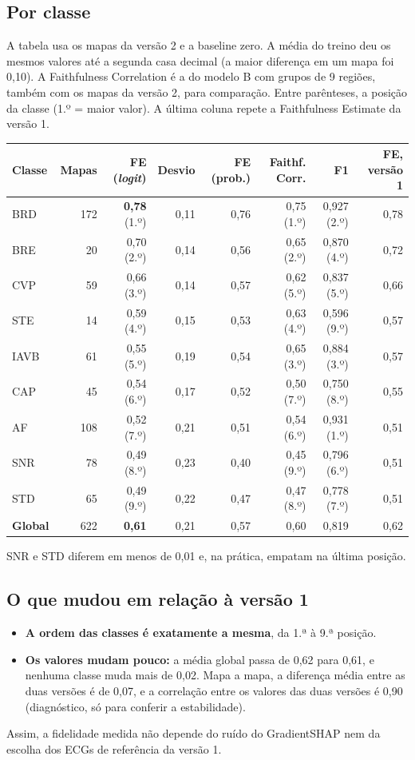\documentclass[11pt,a4paper]{article}
\begin{document}
\subsection{Por classe}
A tabela usa os mapas da versão 2 e a baseline zero. A média do treino deu os mesmos valores até a segunda casa decimal (a maior diferença em um mapa foi 0,10). A Faithfulness Correlation é a do modelo B com grupos de 9 regiões, também com os mapas da versão 2, para comparação. Entre parênteses, a posição da classe (1.º = maior valor). A última coluna repete a Faithfulness Estimate da versão 1.
\begin{center}\small
\begin{tabularx}{\linewidth}{Xrrrrrrr}
\toprule
\textbf{Classe} & \textbf{Mapas} & \textbf{FE (\textit{logit})} & \textbf{Desvio} & \textbf{FE (prob.)} & \textbf{Faithf. Corr.} & \textbf{F1} & \textbf{FE, versão 1} \\
\midrule
BRD  & 172 & \textbf{0,78} (1.º) & 0,11 & 0,76 & 0,75 (1.º) & 0,927 (2.º) & 0,78 \\
BRE  &  20 & 0,70 (2.º) & 0,14 & 0,56 & 0,65 (2.º) & 0,870 (4.º) & 0,72 \\
CVP  &  59 & 0,66 (3.º) & 0,14 & 0,57 & 0,62 (5.º) & 0,837 (5.º) & 0,66 \\
STE  &  14 & 0,59 (4.º) & 0,15 & 0,53 & 0,63 (4.º) & 0,596 (9.º) & 0,57 \\
IAVB &  61 & 0,55 (5.º) & 0,19 & 0,54 & 0,65 (3.º) & 0,884 (3.º) & 0,57 \\
CAP  &  45 & 0,54 (6.º) & 0,17 & 0,52 & 0,50 (7.º) & 0,750 (8.º) & 0,55 \\
AF   & 108 & 0,52 (7.º) & 0,21 & 0,51 & 0,54 (6.º) & 0,931 (1.º) & 0,51 \\
SNR  &  78 & 0,49 (8.º) & 0,23 & 0,40 & 0,45 (9.º) & 0,796 (6.º) & 0,51 \\
STD  &  65 & 0,49 (9.º) & 0,22 & 0,47 & 0,47 (8.º) & 0,778 (7.º) & 0,51 \\
\midrule
\textbf{Global} & 622 & \textbf{0,61} & 0,21 & 0,57 & 0,60 & 0,819 & 0,62 \\
\bottomrule
\end{tabularx}
\end{center}
SNR e STD diferem em menos de 0,01 e, na prática, empatam na última posição.

\subsection{O que mudou em relação à versão 1}
\begin{itemize}
\item \textbf{A ordem das classes é exatamente a mesma}, da 1.ª à 9.ª posição.
\item \textbf{Os valores mudam pouco:} a média global passa de 0,62 para 0,61, e nenhuma classe muda mais de 0,02. Mapa a mapa, a diferença média entre as duas versões é de 0,07, e a correlação entre os valores das duas versões é 0,90 (diagnóstico, só para conferir a estabilidade).
\end{itemize}
Assim, a fidelidade medida não depende do ruído do GradientSHAP nem da escolha dos ECGs de referência da versão 1.
\end{document}
